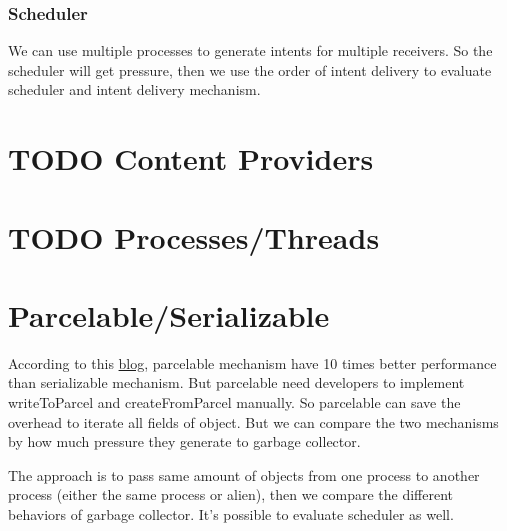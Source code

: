 \documentclass[11pt]{article}
\begin{document}
\subsubsection{Scheduler}
\label{sec-3-2-3}
We can use multiple processes to generate intents for multiple receivers.
So the scheduler will get pressure, then we use the order of intent delivery
to evaluate scheduler and intent delivery mechanism.

\section{{\bfseries\sffamily TODO} Content Providers}
\label{sec-4}

\section{{\bfseries\sffamily TODO} Processes/Threads}
\label{sec-5}

\section{Parcelable/Serializable}
\label{sec-6}
According to this \href{http://www.developerphil.com/parcelable-vs-serializable/}{blog}, parcelable mechanism have 10 times better performance than serializable mechanism.
But parcelable need developers to implement writeToParcel and createFromParcel manually.
So parcelable can save the overhead to iterate all fields of object.
But we can compare the two mechanisms by how much pressure they generate to garbage collector.

The approach is to pass same amount of objects from one process to another process (either the same process or alien),
then we compare the different behaviors of garbage collector.
It's possible to evaluate scheduler as well.
\end{document}
